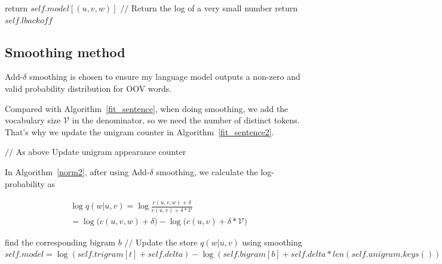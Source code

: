 \begin{algorithm}[]
  \caption{$cond\_logprob$}
  \label{cond_logprob}
  {
    return $self.model[(u, v, w)]$
  }
  \Else
  {
    $//$ Return the log of a very small number 
    return $self.lbackoff$
  }
\end{algorithm}




\subsection{\textbf{Smoothing method}}

Add-$\delta$ smoothing is chosen to ensure my language model outputs a non-zero and valid probability distribution for OOV words.

Compared with Algorithm~\ref{fit_sentence}, when doing smoothing, we add the vocabulary size $\mathcal{V}$ in the denominator, so we need the number of distinct tokens. That's why we update the unigram counter in Algorithm~\ref{fit_sentence2}.

\begin{algorithm}[]
  \caption{$fit\_sentence$}
  \label{fit_sentence2}
  $//$ As above\;
  {
    Update unigram appearance counter\;
  }
\end{algorithm}

In Algorithm~\ref{norm2}, after using Add-$\delta$ smoothing, we calculate the log-probability as 

$$
\begin{aligned}
&\log q(w | u, v)=\log\frac{c(u, v, w)+\delta}{c(u, v)+\delta * \mathcal{V}}\\
&=\log \Big(c(u, v, w)+\delta \Big) - \log \Big(c(u, v) + \delta * \mathcal{V} \Big)
\end{aligned}
$$

\begin{algorithm}[]
  \caption{$norm$}
  \label{norm2}
  {
    find the corresponding bigram $b$\;
    $//$ Update the store $q(w|u,v)$ using smoothing
    $self.model = \log(self.trigram[t]+self.delta) - \log(self.bigram[b]+self.delta*len(self.unigram.keys()))$
  }
\end{algorithm}

